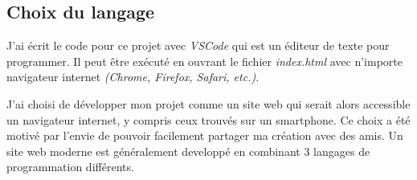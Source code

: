 \documentclass[11pt,french,a4paper,]{article}
\begin{document}
\hypertarget{choix-du-langage}{%
\subsection{Choix du langage}\label{choix-du-langage}}

J'ai écrit le code pour ce projet avec \emph{VSCode} qui est un éditeur
de texte pour programmer. Il peut être exécuté en ouvrant le fichier
\emph{index.html} avec n'importe navigateur internet \emph{(Chrome,
Firefox, Safari, etc.)}.

J'ai choisi de développer mon projet comme un site web qui serait alors
accessible un navigateur internet, y compris ceux trouvés sur un
smartphone. Ce choix a été motivé par l'envie de pouvoir facilement
partager ma création avec des amis. Un site web moderne est généralement
developpé en combinant 3 langages de programmation différents.
\end{document}
